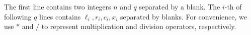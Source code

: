 The first line contains two integers $n$ and $q$ separated by a blank.
The $i$-th of following $q$ lines contains $\ell_i, r_i, c_i, x_i$
separated by blanks. For convenience, we use $*$ and $/$ to represent
multiplication and division operators, respectively.
